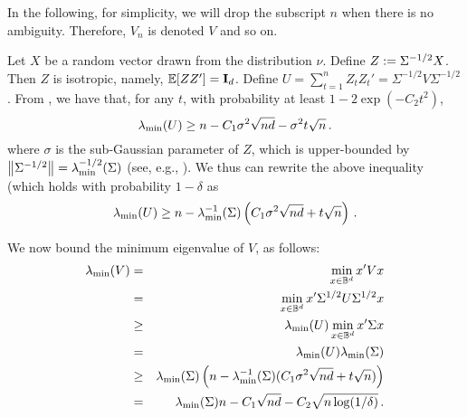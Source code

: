 In the following, for simplicity, we will drop the subscript $n$ when there is no ambiguity.  Therefore, $V_n$ is denoted $V$ and so on.

\iffalse
We will need a technical lemma, which is an existing result in random matrix theory. The version we presented here is adapted from Equation (5.23) of Theorem 5.39 from \citet{vershynin2010introduction}.
\begin{lemma}
\label{lem:rmsv}
Let $A\in\R^{n\times d}$ be a matrix whose rows $A_i$ are independent sub-Gaussian isotropic random vectors in $\R^d$ with parameter $\sigma$, namely, $\E \exp(x' (A_i - \E A_i)) \le \exp(\sigma^2 \norm{x}^2/2)$ for any $x \in \R^d$.  Then, there exist positive, universal constants $C_1$ and $C_2$ such that, for every $t \ge 0$, the following holds with
probability at least $1-2\exp(-C_2t^2)$:
\[
 \left\|\frac{1}{n} A'A - \mathbf{I}_d \right\| \le \max\{\delta, \delta^2\}, \quad \textrm{where } \delta = \sigma^2 \left( C_1 \sqrt{\frac{d}{n}} + \frac{t}{\sqrt{n}} \right). 
\]
\end{lemma}
\fi

Let $X$ be a random vector drawn from the distribution $\nu$.  Define $Z:= \Sigma^{-1/2}X$.  Then $Z$ is isotropic, namely, $\mathbb{E}[ZZ'] = \mathbf{I}_d$.  Define $U=\sum_{t=1}^n Z_tZ_t' = \Sigma^{-1/2}V\Sigma^{-1/2}$.
From , we have that, for any $t$, with probability at least $1-2\exp(-C_2t^2)$,
\[
\lambda_{\min}(U)\ge n - C_1 \sigma^2 \sqrt{nd} - \sigma^2 t \sqrt{n} \,. 
\]
where $\sigma$ is the sub-Gaussian parameter of $Z$, which is upper-bounded by $\left\|\Sigma^{-1/2}\right\| = \lambda_{\min}^{-1/2}(\Sigma)$ (see, e.g., \citet{vershynin2010introduction}).  
We thus can rewrite the above inequality (which holds with probability $1-\delta$ as
\[
\lambda_{\min}(U) \ge n - \lambda_{\min}^{-1}(\Sigma) \left(C_1 \sigma^2 \sqrt{nd} + t \sqrt{n} \right) \,.
\]

We now bound the minimum eigenvalue of $V$, as follows:
\begin{eqnarray*}
\lambda_{\min}(V) &=& \min_{x\in\mathbb{B}^d} x'Vx \\
&=& \min_{x\in\mathbb{B}^d}x'\Sigma^{1/2}U\Sigma^{1/2}x \\
&\ge& \lambda_{\min}(U) \min_{x\in\mathbb{B}^d}x'\Sigma x \\
&=& \lambda_{\min}(U) \lambda_{\min}(\Sigma) \\
&\ge& \lambda_{\min}(\Sigma) \left( n - \lambda_{\min}^{-1}(\Sigma) (C_1 \sigma^2 \sqrt{nd} + t \sqrt{n} ) \right) \\
&=& \lambda_{\min}(\Sigma) n - C_1 \sqrt{nd} - C_2 \sqrt{n \log(1/\delta)}\,.
\end{eqnarray*}

